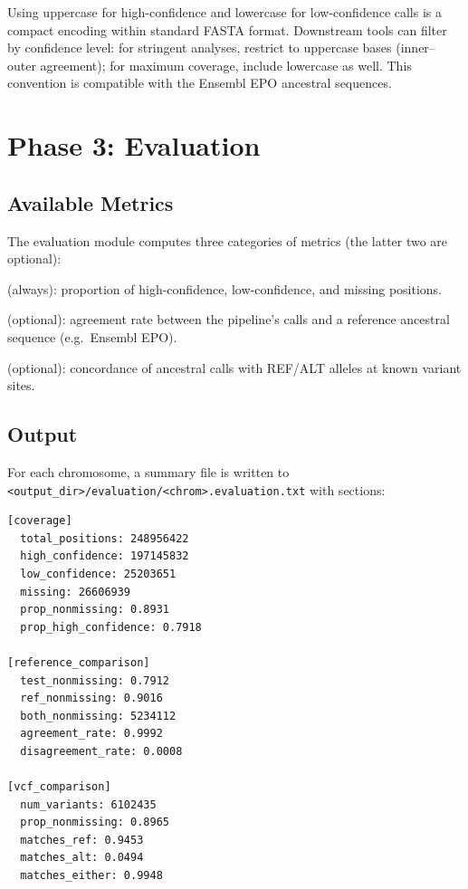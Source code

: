 \documentclass[11pt,a4paper]{article}
\begin{document}
\begin{conceptbox}
Using uppercase for high-confidence and lowercase for low-confidence calls is a compact encoding within standard FASTA format.  Downstream tools can filter by confidence level: for stringent analyses, restrict to uppercase bases (inner--outer agreement); for maximum coverage, include lowercase as well.  This convention is compatible with the Ensembl EPO ancestral sequences.
\end{conceptbox}


\section{Phase 3: Evaluation}
\label{sec:phase3}

\subsection{Available Metrics}

The evaluation module computes three categories of metrics (the latter two are optional):

\begin{description}[leftmargin=2em]
    \item[Coverage statistics] (always): proportion of high-confidence, low-confidence, and missing positions.
    \item[Reference comparison] (optional): agreement rate between the pipeline's calls and a reference ancestral sequence (e.g.\ Ensembl EPO).
    \item[VCF comparison] (optional): concordance of ancestral calls with REF/ALT alleles at known variant sites.
\end{description}

\subsection{Output}

For each chromosome, a summary file is written to \texttt{<output\_dir>/evaluation/<chrom>.evaluation.txt} with sections:

\begin{lstlisting}[style=bashstyle, caption={Example evaluation output.}]
[coverage]
  total_positions: 248956422
  high_confidence: 197145832
  low_confidence: 25203651
  missing: 26606939
  prop_nonmissing: 0.8931
  prop_high_confidence: 0.7918

[reference_comparison]
  test_nonmissing: 0.7912
  ref_nonmissing: 0.9016
  both_nonmissing: 5234112
  agreement_rate: 0.9992
  disagreement_rate: 0.0008

[vcf_comparison]
  num_variants: 6102435
  prop_nonmissing: 0.8965
  matches_ref: 0.9453
  matches_alt: 0.0494
  matches_either: 0.9948
\end{lstlisting}
\end{document}
